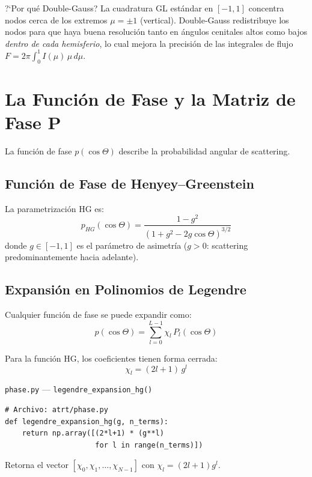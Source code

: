 \documentclass[a4paper,11pt]{article}
\begin{document}
\begin{physics}{?`Por qu\'e Double-Gauss?}
La cuadratura GL est\'andar en $[-1,1]$ concentra nodos cerca de los extremos $\mu = \pm 1$ (vertical).  Double-Gauss redistribuye los nodos para que haya buena resoluci\'on tanto en \'angulos cenitales altos como bajos \textit{dentro de cada hemisferio}, lo cual mejora la precisi\'on de las integrales de flujo $F = 2\pi \int_0^1 I(\mu) \, \mu \, d\mu$.
\end{physics}

\section{La Funci\'on de Fase y la Matriz de Fase $\mathbf{P}$}
\label{sec:phase}

La funci\'on de fase $p(\cos\Theta)$ describe la probabilidad angular de scattering.

\subsection{Funci\'on de Fase de Henyey--Greenstein}

La parametrizaci\'on HG es:
\begin{equation}
p_{HG}(\cos\Theta) = \frac{1 - g^2}{(1 + g^2 - 2g\cos\Theta)^{3/2}}
\end{equation}
donde $g \in [-1, 1]$ es el par\'ametro de asimetr\'ia ($g > 0$: scattering predominantemente hacia adelante).

\subsection{Expansi\'on en Polinomios de Legendre}

Cualquier funci\'on de fase se puede expandir como:
\begin{equation}
p(\cos\Theta) = \sum_{l=0}^{L-1} \chi_l \, P_l(\cos\Theta)
\end{equation}

Para la funci\'on HG, los coeficientes tienen forma cerrada:
\begin{equation}
\boxed{\chi_l = (2l + 1) \, g^l}
\label{eq:chi_l}
\end{equation}

\begin{implementation}{\texttt{phase.py} --- \texttt{legendre\_expansion\_hg()}}
\begin{lstlisting}
# Archivo: atrt/phase.py
def legendre_expansion_hg(g, n_terms):
    return np.array([(2*l+1) * (g**l)
                     for l in range(n_terms)])
\end{lstlisting}
Retorna el vector $[\chi_0, \chi_1, \ldots, \chi_{N-1}]$ con $\chi_l = (2l+1)g^l$.
\end{implementation}
\end{document}
